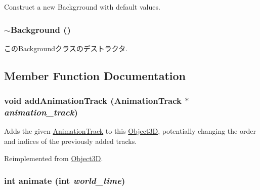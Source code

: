 Construct a new Backgrround with default values. \hypertarget{classm3g_1_1Background_b793cb50870532320856acdd2caf84c3}{
\subsubsection[{$\sim$Background}]{\setlength{\rightskip}{0pt plus 5cm}$\sim${\bf Background} ()}}
\label{classm3g_1_1Background_b793cb50870532320856acdd2caf84c3}


このBackgroundクラスのデストラクタ. 

\subsection{Member Function Documentation}
\hypertarget{classm3g_1_1Background_415c0b110f95410ded9b85e5d99a496b}{
\subsubsection[{addAnimationTrack}]{\setlength{\rightskip}{0pt plus 5cm}void addAnimationTrack ({\bf AnimationTrack} $\ast$ {\em animation\_\-track})}}
\label{classm3g_1_1Background_415c0b110f95410ded9b85e5d99a496b}


Adds the given \hyperlink{classm3g_1_1AnimationTrack}{AnimationTrack} to this \hyperlink{classm3g_1_1Object3D}{Object3D}, potentially changing the order and indices of the previously added tracks. 

Reimplemented from \hyperlink{classm3g_1_1Object3D_415c0b110f95410ded9b85e5d99a496b}{Object3D}.\hypertarget{classm3g_1_1Background_8aad1ceab4c2a03609c8a42324ce484d}{
\subsubsection[{animate}]{\setlength{\rightskip}{0pt plus 5cm}int animate (int {\em world\_\-time})}}
\label{classm3g_1_1Background_8aad1ceab4c2a03609c8a42324ce484d}



